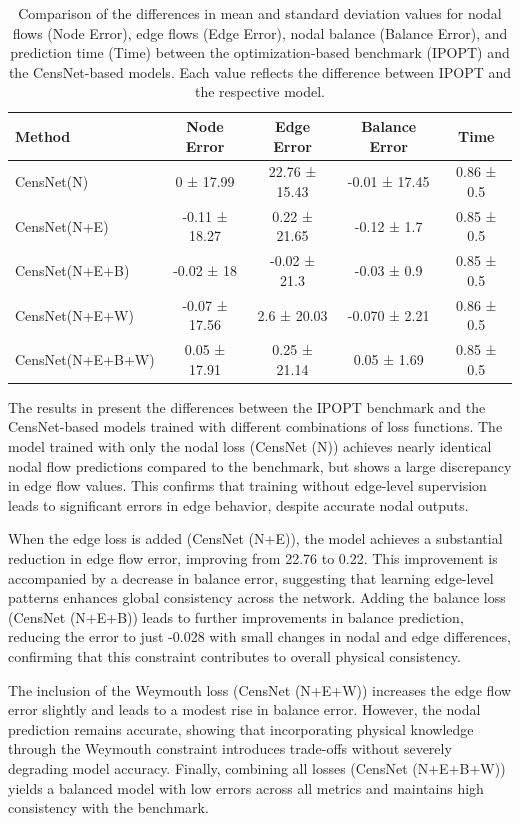 \begin{table}[htbp]
\centering
\begin{tabular}{|l|c|c|c|c|}
    \hline
    Method & Node Error & Edge Error & Balance Error & Time \\ \hline
    CensNet(N) & 0 ± 17.99 & 22.76 ± 15.43 & -0.01 ± 17.45 & 0.86 ± 0.5 \\ \hline
    CensNet(N+E) & -0.11 ± 18.27 & 0.22 ± 21.65 & -0.12 ± 1.7 & 0.85 ± 0.5 \\ \hline
    CensNet(N+E+B) & -0.02 ± 18 & -0.02 ± 21.3 & -0.03 ± 0.9 & 0.85 ± 0.5 \\ \hline
    CensNet(N+E+W) & -0.07 ± 17.56 & 2.6 ± 20.03 & -0.070 ± 2.21 & 0.86 ± 0.5 \\ \hline
    CensNet(N+E+B+W) & 0.05 ± 17.91 & 0.25 ± 21.14 & 0.05 ± 1.69 & 0.85 ± 0.5 \\ \hline
\end{tabular}
\caption{Comparison of the differences in mean and standard deviation values for nodal flows (Node Error), edge flows (Edge Error), nodal balance (Balance Error), and prediction time (Time) between the optimization-based benchmark (IPOPT) and the CensNet-based models. Each value reflects the difference between IPOPT and the respective model.}
\label{tab:base_nl_dummy_results_simplified}
\end{table}

The results in  present the differences between the IPOPT benchmark and the CensNet-based models trained with different combinations of loss functions. The model trained with only the nodal loss (CensNet (N)) achieves nearly identical nodal flow predictions compared to the benchmark, but shows a large discrepancy in edge flow values. This confirms that training without edge-level supervision leads to significant errors in edge behavior, despite accurate nodal outputs.

When the edge loss is added (CensNet (N+E)), the model achieves a substantial reduction in edge flow error, improving from 22.76 to 0.22. This improvement is accompanied by a decrease in balance error, suggesting that learning edge-level patterns enhances global consistency across the network. Adding the balance loss (CensNet (N+E+B)) leads to further improvements in balance prediction, reducing the error to just -0.028 with small changes in nodal and edge differences, confirming that this constraint contributes to overall physical consistency.

The inclusion of the Weymouth loss (CensNet (N+E+W)) increases the edge flow error slightly and leads to a modest rise in balance error. However, the nodal prediction remains accurate, showing that incorporating physical knowledge through the Weymouth constraint introduces trade-offs without severely degrading model accuracy. Finally, combining all losses (CensNet (N+E+B+W)) yields a balanced model with low errors across all metrics and maintains high consistency with the benchmark.

